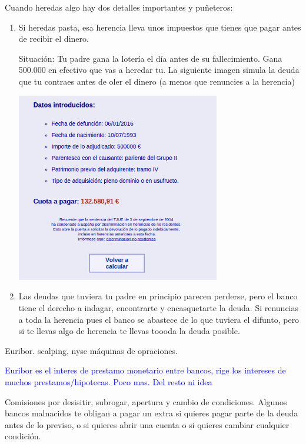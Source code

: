 \documentclass[nochap,palatino,shortheader]{apuntes}
\begin{document}
Cuando heredas algo hay dos detalles importantes y puñeteros:
\begin{enumerate}
\item Si heredas pasta, esa herencia lleva unos impuestos que tienes que pagar antes de recibir el dinero.

Situación: Tu padre gana la lotería el día antes de su fallecimiento. Gana 500.000 \texteuro en efectivo que vas a heredar tu. La siguiente imagen simula la deuda que tu contraes antes de oler el dinero (a menos que renuncies a la herencia)

\begin{center}
\includegraphics[width=0.7\textwidth]{img/simulacion_sucesiones.png}
\end{center}

\item Las deudas que tuviera tu padre en principio parecen perderse, pero el banco tiene el derecho a indagar, encontrarte y encasquetarte la deuda. Si renuncias a toda la herencia pues el banco se abastece de lo que tuviera el difunto, pero si te llevas algo de herencia te llevas toooda la deuda posible.

\end{enumerate}

\color{black}

Euribor.  scalping, nyse máquinas de opraciones.

\textcolor{blue}{Euribor es el interes de prestamo monetario entre bancos, rige los intereses de muchos prestamos/hipotecas. Poco mas. Del resto ni idea}

Comisiones por desisitir, subrogar, apertura y cambio de condiciones.
\color{blue}
Algunos bancos malnacidos te obligan a pagar un extra si quieres pagar parte de la deuda antes de lo previso, o si quieres abrir una cuenta o si quieres cambiar cualquier condición.
\end{document}
